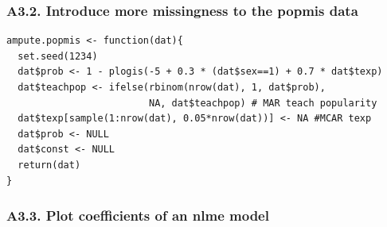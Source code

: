 \documentclass[
  article]{jss}
\begin{document}
\subsubsection{A3.2. Introduce more missingness to the popmis
data}\label{a3.2.-introduce-more-missingness-to-the-popmis-data}

\begin{verbatim}
ampute.popmis <- function(dat){
  set.seed(1234)
  dat$prob <- 1 - plogis(-5 + 0.3 * (dat$sex==1) + 0.7 * dat$texp)
  dat$teachpop <- ifelse(rbinom(nrow(dat), 1, dat$prob),
                         NA, dat$teachpop) # MAR teach popularity
  dat$texp[sample(1:nrow(dat), 0.05*nrow(dat))] <- NA #MCAR texp
  dat$prob <- NULL
  dat$const <- NULL
  return(dat)
}
\end{verbatim}

\subsubsection{A3.3. Plot coefficients of an nlme
model}\label{a3.3.-plot-coefficients-of-an-nlme-model}
\end{document}
